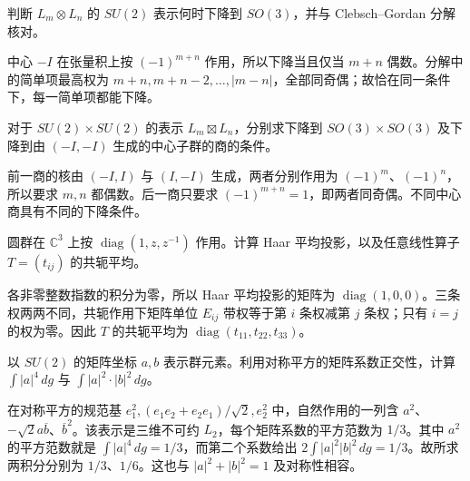 \begin{exercise}\label{b5:ex:C-su2-tensor-descent}
	判断 \(L_m\otimes L_n\) 的 \(SU(2)\) 表示何时下降到 \(SO(3)\)，并与 Clebsch--Gordan 分解核对。
\end{exercise}
\begin{solution}
	中心 \(-I\) 在张量积上按 \((-1)^{m+n}\) 作用，所以下降当且仅当 \(m+n\) 偶数。分解中的简单项最高权为 \(m+n,m+n-2,\ldots,|m-n|\)，全部同奇偶；故恰在同一条件下，每一简单项都能下降。
\end{solution}

\begin{exercise}\label{b5:ex:C-product-descent}
	对于 \(SU(2)\times SU(2)\) 的表示 \(L_m\boxtimes L_n\)，分别求下降到 \(SO(3)\times SO(3)\) 及下降到由 \((-I,-I)\) 生成的中心子群的商的条件。
\end{exercise}
\begin{solution}
	前一商的核由 \((-I,I)\) 与 \((I,-I)\) 生成，两者分别作用为 \((-1)^m\)、\((-1)^n\)，所以要求 \(m,n\) 都偶数。后一商只要求 \((-1)^{m+n}=1\)，即两者同奇偶。不同中心商具有不同的下降条件。
\end{solution}

\begin{exercise}\label{b5:ex:C-circle-average}
	圆群在 \(\mathbb C^3\) 上按 \(\operatorname{diag}(1,z,z^{-1})\) 作用。计算 Haar 平均投影，以及任意线性算子 \(T=(t_{ij})\) 的共轭平均。
\end{exercise}
\begin{solution}
	各非零整数指数的积分为零，所以 Haar 平均投影的矩阵为 \(\operatorname{diag}(1,0,0)\)。三条权两两不同，共轭作用下矩阵单位 \(E_{ij}\) 带权等于第 \(i\) 条权减第 \(j\) 条权；只有 \(i=j\) 的权为零。因此 \(T\) 的共轭平均为 \(\operatorname{diag}(t_{11},t_{22},t_{33})\)。
\end{solution}

\begin{exercise}\label{b5:ex:C-su2-fourth-moments}
	以 \(SU(2)\) 的矩阵坐标 \(a,b\) 表示群元素。利用对称平方的矩阵系数正交性，计算 \(\int|a|^4\,dg\) 与 \(\int|a|^2\cdot|b|^2\,dg\)。
\end{exercise}
\begin{solution}
	在对称平方的规范基 \(e_1^2,(e_1e_2+e_2e_1)/\sqrt2,e_2^2\) 中，自然作用的一列含 \(a^2\)、\(-\sqrt2a\overline b\)、\(\overline b^{2}\)。该表示是三维不可约 \(L_2\)，每个矩阵系数的平方范数为 \(1/3\)。其中 \(a^2\) 的平方范数就是 \(\int|a|^4\,dg=1/3\)，而第二个系数给出 \(2\int|a|^2|b|^2\,dg=1/3\)。故所求两积分分别为 \(1/3\)、\(1/6\)。这也与 \(|a|^2+|b|^2=1\) 及对称性相容。
\end{solution}

